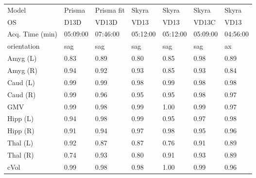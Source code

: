 \begin{table}
\begin{tabular}{lllllll}
Model                 &               Prisma &           Prisma fit &              Skyra &               Skyra &               Skyra &               Skyra \\
OS                    &                 D13D &                VD13D &               VD13 &                VD13 &               VD13C &                VD13 \\
Acq. Time (min)       &             05:09:00 &             07:46:00 &           05:12:00 &            05:12:00 &            05:09:00 &            04:56:00 \\
orientation           &                  sag &                  sag &                sag &                 sag &                 sag &                  ax \\
Amyg (L)              &                 0.83 &                 0.89 &               0.80 &                0.85 &                0.98 &                0.89 \\
Amyg (R)              &                 0.94 &                 0.92 &               0.93 &                0.85 &                0.93 &                0.84 \\
Caud (L)              &                 0.99 &                 0.99 &               0.98 &                0.99 &                0.98 &                0.98 \\
Caud (R)              &                 0.99 &                 0.96 &               0.95 &                0.95 &                0.98 &                0.97 \\
GMV                   &                 0.99 &                 0.98 &               0.99 &                1.00 &                0.99 &                0.97 \\
Hipp (L)              &                 0.94 &                 0.98 &               0.99 &                0.95 &                0.97 &                0.98 \\
Hipp (R)              &                 0.91 &                 0.94 &               0.97 &                0.98 &                0.95 &                0.96 \\
Thal (L)              &                 0.92 &                 0.87 &               0.87 &                0.76 &                0.91 &                0.89 \\
Thal (R)              &                 0.74 &                 0.93 &               0.80 &                0.91 &                0.93 &                0.89 \\
cVol                  &                 0.99 &                 0.98 &               0.98 &                1.00 &                0.99 &                0.96 \\

\end{tabular}
\end{table}
